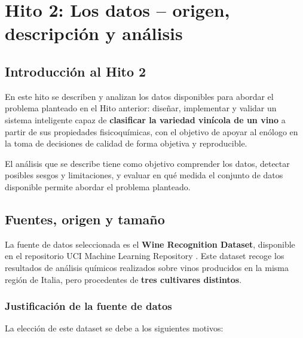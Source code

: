 
\chapter{Hito 2: Los datos -- origen, descripci\'on y an\'alisis}

\section{Introducci\'on al Hito 2}

En este hito se describen y analizan los datos disponibles para abordar el problema
planteado en el Hito anterior: diseñar, implementar y validar un sistema inteligente capaz
de \textbf{clasificar la variedad vinícola de un vino} a partir de sus propiedades
fisicoqu\'imicas, con el objetivo de apoyar al en\'ologo en la toma de decisiones de
calidad de forma objetiva y reproducible.

El an\'alisis que se describe tiene como objetivo comprender los datos, detectar
posibles sesgos y limitaciones, y evaluar en qu\'e medida el conjunto de datos
disponible permite abordar el problema planteado.

\section{Fuentes, origen y tama\~no}

La fuente de datos seleccionada es el \textbf{Wine Recognition Dataset}, disponible
en el repositorio UCI Machine Learning Repository \cite{UCIWine}. Este dataset recoge
los resultados de an\'alisis qu\'imicos realizados sobre vinos producidos en la misma
regi\'on de Italia, pero procedentes de \textbf{tres cultivares distintos}.

\subsection{Justificaci\'on de la fuente de datos}

La elecci\'on de este dataset se debe a los siguientes motivos:

